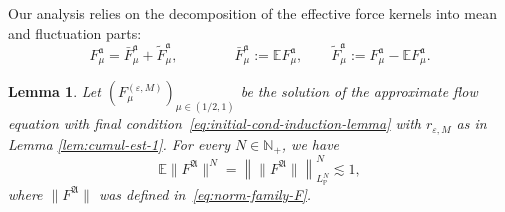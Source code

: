 \documentclass{article}
\numberwithin{equation}{section}
\newcommand{\assign}{:=}
\theoremstyle{plain}
\newtheorem{lemma}[theorem]{Lemma}
\theoremstyle{definition}
\begin{document}
Our analysis relies on the decomposition of the effective force kernels into
mean and fluctuation parts:
\[ F^{\mathfrak{a}}_{\mu} = {\bar{F}_{\mu}^{\mathfrak{a}}}  +
   \tilde{F}_{\mu}^{\mathfrak{a}}, \qquad \qquad
   {\bar{F}_{\mu}^{\mathfrak{a}}}  \assign \mathbb{E}F^{\mathfrak{a}}_{\mu},
   \qquad \tilde{F}_{\mu}^{\mathfrak{a}} \assign F^{\mathfrak{a}}_{\mu}
   -\mathbb{E}F^{\mathfrak{a}}_{\mu} . \]
\begin{lemma}
  \label{lem:kolmogorov} Let $(F_{\mu}^{(\varepsilon,M)})_{\mu \in
  (1 / 2, 1)}$ be the solution of the approximate flow equation with final
  condition~\eqref{eq:initial-cond-induction-lemma} with $r_{\varepsilon, M}$
  as in Lemma \ref{lem:cumul-est-1}. For every $N \in \mathbb{N}_+$, we have
  \begin{equation}
    \mathbb{E} \| F^{\mathfrak{A}} \|^N = \left\| \| F^{\mathfrak{A}} \|
    \right\|^N_{L^N_{\mathbb{P}}} \lesssim 1, \label{eq:bound-FA}
  \end{equation}
  where $\| F^{\mathfrak{A}} \|$ was defined in~\eqref{eq:norm-family-F}.
\end{lemma}
\end{document}
